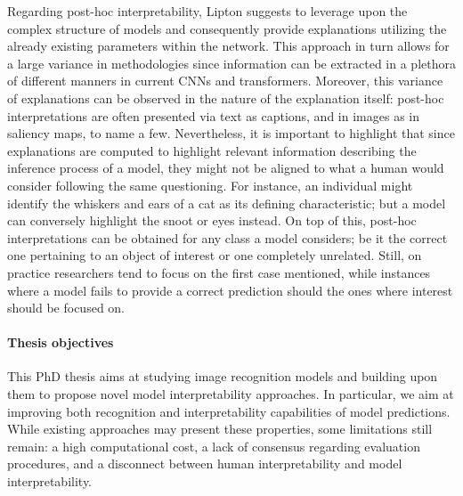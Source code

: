 \noindent Regarding post-hoc interpretability, Lipton suggests to leverage upon the complex 
structure of models and consequently provide explanations utilizing the already existing parameters 
within the network. This approach in turn allows for a large variance in methodologies since 
information can be extracted in a plethora of different manners in current CNNs and transformers. 
Moreover, this variance of explanations can be observed in the nature of the explanation itself: 
post-hoc interpretations are often presented via text as captions, and in images as in 
saliency maps, to name a few. Nevertheless, it is important to highlight that since explanations 
are computed to highlight relevant information describing the inference process of a model, they 
might not be aligned to what a human would consider following the same questioning. For instance, 
an individual might identify the whiskers and ears of a cat as its defining characteristic; but 
a model can conversely highlight the snoot or eyes instead. On top of this, post-hoc 
interpretations can be obtained for any class a model considers; be it the correct one pertaining 
to an object of interest or one completely unrelated. Still, on practice researchers tend to focus 
on the first case mentioned, while instances where a model fails to provide a correct 
prediction should the ones where interest should be focused on.\\


\paragraph{Thesis objectives} This PhD thesis aims at studying image recognition models and 
building upon them to propose novel model interpretability approaches. In particular, we aim at 
improving both recognition and interpretability capabilities of model predictions. While existing 
approaches may present these properties, some limitations still remain: a high 
computational cost, a lack of consensus regarding evaluation procedures, and a disconnect between 
human interpretability and model interpretability.\\

